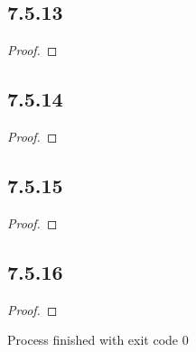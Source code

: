 \documentclass{article}
\begin{document}
\subsection*{7.5.13}

\begin{proof}

\end{proof}

\subsection*{7.5.14}

\begin{proof}

\end{proof}

\subsection*{7.5.15}

\begin{proof}

\end{proof}

\subsection*{7.5.16}

\begin{proof}

\end{proof}


Process finished with exit code 0




 
\end{document}

